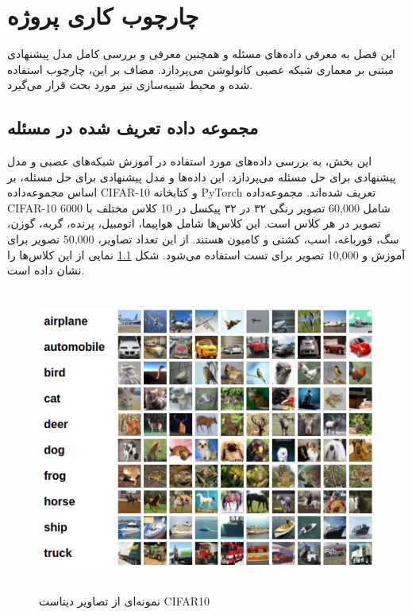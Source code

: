 
\chapter{چارچوب کاری پروژه}

این فصل به معرفی داده‌های مسئله و همچنین معرفی و بررسی کامل مدل پیشنهادی مبتنی بر معماری شبکه عصبی کانولوشن می‌پردازد. مضاف بر این، چارچوب استفاده شده و محیط شبیه‌سازی نیز مورد بحث قرار می‌گیرد.

\section{مجموعه داده تعریف شده در مسئله}

این بخش، به بررسی داده‌های مورد استفاده در آموزش شبکه‌های عصبی و مدل پیشنهادی برای حل مسئله می‌پردازد. این داده‌ها و مدل پیشنهادی برای حل مسئله، بر اساس مجموعه‌داده CIFAR-10 و کتابخانه PyTorch تعریف شده‌اند.
مجموعه‌داده CIFAR-10 شامل 60,000 تصویر رنگی ۳۲ در ۳۲ پیکسل  در 10 کلاس مختلف با 6000 تصویر در هر کلاس است. این کلاس‌ها شامل هواپیما، اتومبیل، پرنده، گربه، گوزن، سگ، قورباغه، اسب، کشتی و کامیون هستند. از این تعداد تصاویر، 50,000 تصویر برای آموزش و 10,000 تصویر برای تست استفاده می‌شود. شکل \ref{cifar} نمایی از این کلاس‌ها را نشان داده است.

\begin{figure}[H]
    \centering
   \includegraphics[height=10cm,width=12cm]{./cifar/cifar10.png}
   \caption{ نمونه‌ای از تصاویر دیتاست CIFAR10}
   \label{cifar}
   \centering
\end{figure}


